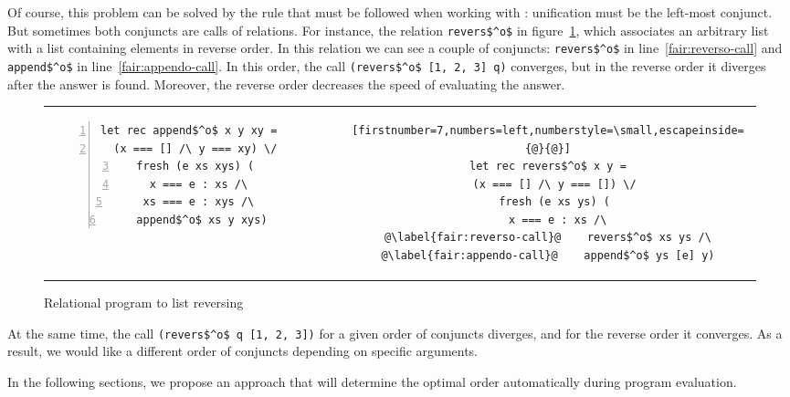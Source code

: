 Of course, this problem can be solved by the rule that must be followed when working with \mk: unification must be the left-most conjunct.
But sometimes both conjuncts are calls of relations.
For instance, the relation \lstinline{revers$^o$} in figure~\ref{fair:lst-reverso}, which associates an arbitrary list with a list containing elements in reverse order.
In this relation we can see a couple of conjuncts: \lstinline{revers$^o$} in line~\ref{fair:reverso-call} and \lstinline{append$^o$} in line~\ref{fair:appendo-call}. In this order, the call \lstinline{(revers$^o$ [1, 2, 3] q)} converges, but in the reverse order it diverges after the answer is found. Moreover, the reverse order decreases the speed of evaluating the answer.

\begin{figure}[h]
\centering
\begin{tabular}{cp{3cm}c}
\begin{lstlisting}[numbers=left,numberstyle=\small]
let rec append$^o$ x y xy =
  (x === [] /\ y === xy) \/
  fresh (e xs xys) (
    x === e : xs /\ 
    xs === e : xys /\ 
    append$^o$ xs y xys)
\end{lstlisting}
& &
\begin{lstlisting}[firstnumber=7,numbers=left,numberstyle=\small,escapeinside={@}{@}]
let rec revers$^o$ x y =
  (x === [] /\ y === []) \/
  fresh (e xs ys) (
    x === e : xs /\ 
@\label{fair:reverso-call}@    revers$^o$ xs ys /\
@\label{fair:appendo-call}@    append$^o$ ys [e] y)
\end{lstlisting}
\end{tabular}

\caption{Relational program to list reversing}
\label{fair:lst-reverso}
\end{figure}


At the same time, the call \lstinline{(revers$^o$ q [1, 2, 3])} for a given order of conjuncts diverges, and for the reverse order it converges. As a result, we would like a different order of conjuncts depending on specific arguments.

In the following sections, we propose an approach that will determine the optimal order automatically during program evaluation.